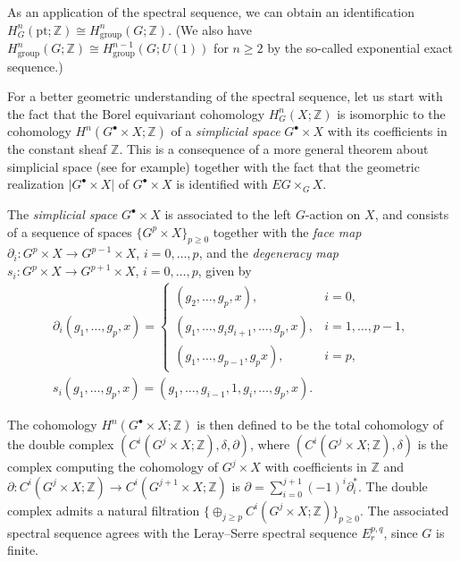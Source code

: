 \documentclass[pdftex]{sigma}
\theoremstyle{definition}
\newcommand{\Z}{\mathbb{Z}}
\newcommand{\pt}{\mathrm{pt}}
\begin{document}
As an application of the spectral sequence, we can obtain an identif\/ication $H^n_G(\pt; \Z) \cong H^n_{\mathrm{group}}(G; \Z)$. (We also have $H^n_{\mathrm{group}}(G; \Z) \cong H^{n-1}_{\mathrm{group}}(G; U(1))$ for $n \ge 2$ by the so-called exponential exact sequence.)

For a better geometric understanding of the spectral sequence, let us start with the fact that the Borel equivariant cohomology $H^n_G(X; \Z)$ is isomorphic to the cohomology $H^n(G^\bullet \times X; \Z)$ of a \textit{simplicial space} $G^\bullet \times X$ with its coef\/f\/icients in the constant sheaf $\Z$. This is a consequence of a more general theorem about simplicial space (see \cite{D} for example) together with the fact that the geometric realization $\lvert G^\bullet \times X \rvert$ of $G^\bullet \times X$ is identif\/ied with $EG \times_G X$.

The \textit{simplicial space} $G^\bullet \times X$ is associated to the left $G$-action on $X$, and consists of a sequence of spaces $\{ G^p \times X \}_{p \ge 0 }$ together with the \textit{face map} $\partial_i \colon G^p \times X \to G^{p-1} \times X$, $i = 0, \ldots, p$, and the \textit{degeneracy map} $s_i \colon G^p \times X \to G^{p+1} \times X$, $i = 0, \ldots, p$, given by
\begin{gather*}
\partial_i(g_1, \ldots, g_p, x)=
\begin{cases}
(g_2, \ldots, g_p, x), & i = 0, \\
(g_1, \ldots, g_ig_{i+1}, \ldots, g_p, x), & i = 1, \ldots, p-1, \\
(g_1, \ldots, g_{p-1}, g_px), & i = p,
\end{cases}\\
s_i(g_1, \ldots, g_p, x)=(g_1, \ldots, g_{i-1}, 1, g_{i}, \ldots, g_p, x).
\end{gather*}

The cohomology $H^n(G^\bullet \times X; \Z)$ is then def\/ined to be the total cohomology of the double complex $(C^i(G^j \times X; \Z), \delta, \partial)$, where $(C^i(G^j \times X; \Z), \delta)$ is the complex computing the cohomology of $G^j \times X$ with coef\/f\/icients in $\Z$ and $\partial \colon C^i(G^j \times X; \Z) \to C^i(G^{j+1} \times X; \Z)$ is $\partial = \sum\limits_{i = 0}^{j+1}(-1)^i \partial_i^*$. The double complex admits a natural f\/iltration $\{ \oplus_{j \ge p} C^i(G^j \times X; \Z) \}_{p \ge 0}$. The associated spectral sequence agrees with the Leray--Serre spectral sequence $E_r^{p, q}$, since $G$ is f\/inite.
\end{document}
